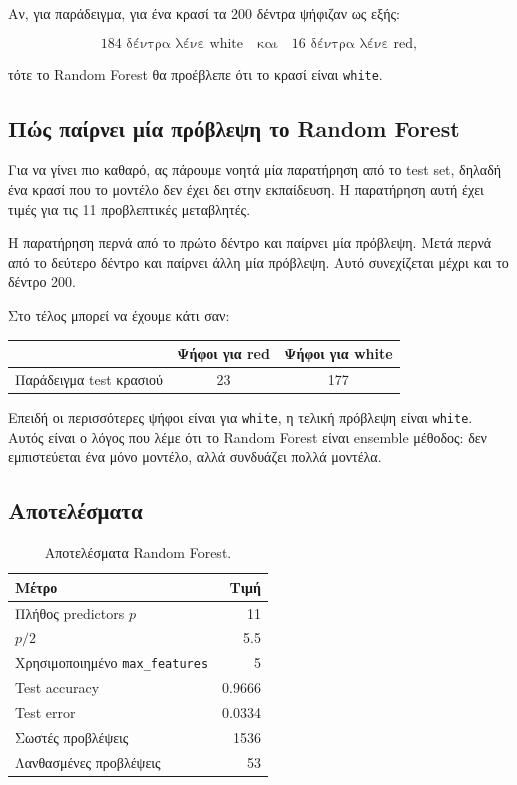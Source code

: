 \documentclass[12pt,a4paper]{article}
\newcommand{\code}[1]{\texttt{\textenglish{#1}}}
\begin{document}
Αν, για παράδειγμα, για ένα κρασί τα 200 δέντρα ψήφιζαν ως εξής:

\[
    184 \text{ δέντρα λένε white}
    \quad \text{και} \quad
    16 \text{ δέντρα λένε red},
\]

τότε το Random Forest θα προέβλεπε ότι το κρασί είναι \code{white}.

\subsection{Πώς παίρνει μία πρόβλεψη το Random Forest}

Για να γίνει πιο καθαρό, ας πάρουμε νοητά μία παρατήρηση από το test set, δηλαδή
ένα κρασί που το μοντέλο δεν έχει δει στην εκπαίδευση. Η παρατήρηση αυτή έχει
τιμές για τις 11 προβλεπτικές μεταβλητές.

Η παρατήρηση περνά από το πρώτο δέντρο και παίρνει μία πρόβλεψη. Μετά περνά από
το δεύτερο δέντρο και παίρνει άλλη μία πρόβλεψη. Αυτό συνεχίζεται μέχρι και το
δέντρο 200.

Στο τέλος μπορεί να έχουμε κάτι σαν:

\begin{center}
\begin{tabular}{lcc}
\toprule
 & \textbf{Ψήφοι για red} & \textbf{Ψήφοι για white} \\
\midrule
Παράδειγμα test κρασιού & 23 & 177 \\
\bottomrule
\end{tabular}
\end{center}

Επειδή οι περισσότερες ψήφοι είναι για \code{white}, η τελική πρόβλεψη είναι
\code{white}. Αυτός είναι ο λόγος που λέμε ότι το Random Forest είναι ensemble
μέθοδος: δεν εμπιστεύεται ένα μόνο μοντέλο, αλλά συνδυάζει πολλά μοντέλα.

\subsection{Αποτελέσματα}

\begin{table}[H]
\centering
\caption{Αποτελέσματα Random Forest.}
\begin{tabular}{lr}
\toprule
\textbf{Μέτρο} & \textbf{Τιμή} \\
\midrule
Πλήθος predictors $p$ & 11 \\
$p/2$ & 5.5 \\
Χρησιμοποιημένο \code{max\_features} & 5 \\
Test accuracy & 0.9666 \\
Test error & 0.0334 \\
Σωστές προβλέψεις & 1536 \\
Λανθασμένες προβλέψεις & 53 \\
\bottomrule
\end{tabular}
\end{table}
\end{document}
